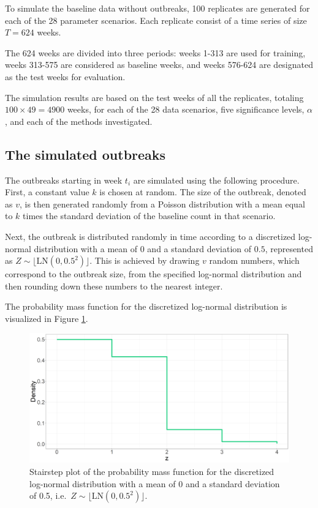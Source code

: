 \documentclass[preprint, 3p, authoryear]{elsarticle} %
\begin{document}
To simulate the baseline data without outbreaks, 100 replicates are generated for each of the 28 parameter scenarios. Each replicate consist of a time series of size \(T=624\) weeks.

The 624 weeks are divided into three periods: weeks 1-313 are used for training, weeks 313-575 are considered as baseline weeks, and weeks 576-624 are designated as the test weeks for evaluation.

The simulation results are based on the test weeks of all the replicates, totaling \(100\times 49=4900\) weeks, for each of the 28 data scenarios, five significance levels, \(\alpha\), and each of the methods investigated.

\hypertarget{the-simulated-outbreaks}{%
\subsection{The simulated outbreaks}\label{the-simulated-outbreaks}}

The outbreaks starting in week \(t_i\) are simulated using the following procedure. First, a constant value \(k\) is chosen at random. The size of the outbreak, denoted as \(v\), is then generated randomly from a Poisson distribution with a mean equal to \(k\) times the standard deviation of the baseline count in that scenario.

Next, the outbreak is distributed randomly in time according to a discretized log-normal distribution with a mean of \(0\) and a standard deviation of \(0.5\), represented as \(Z \sim \lfloor \mathrm{LN}(0,0.5^2)\rfloor\). This is achieved by drawing \(v\) random numbers, which correspond to the outbreak size, from the specified log-normal distribution and then rounding down these numbers to the nearest integer.

The probability mass function for the discretized log-normal distribution is visualized in Figure \ref{fig:PDFLogNormal}.



\begin{figure}[H]
\includegraphics[width=1\linewidth]{../../figures/PDFLogNormal} \caption{Stairstep plot of the probability mass function for the discretized log-normal distribution with a mean of 0 and a standard deviation of 0.5, i.e.~\(Z \sim \lfloor \mathrm{LN}(0,0.5^2)\rfloor\).}\label{fig:PDFLogNormal}
\end{figure}
\end{document}
